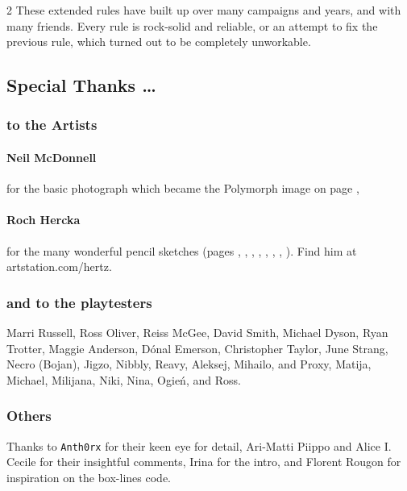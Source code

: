 \begin{multicols}{2}
These extended rules have built up over many \glspl{campaign} and years, and with many friends.
Every rule is rock-solid and reliable, or an attempt to fix the previous rule, which turned out to be completely unworkable.

\subsection*{Special Thanks \ldots}

\subsubsection*{to the Artists}

\paragraph{Neil McDonnell} for the basic photograph which became the Polymorph image on page \pageref{Roch_Hercka/polymorph},

\paragraph{Roch Hercka} for the many wonderful pencil sketches (pages 
\pageref{Roch_Hercka/cave_fight}, 
\pageref{Roch_Hercka/dwarf_encumbrance}, 
\pageref{Roch_Hercka/vitals_shot}, 
\pageref{Roch_Hercka/stances}, 
\pageref{Roch_Hercka/conjuration_right}, 
\pageref{Roch_Hercka/dwarvish_runes}, 
\pageref{Roch_Hercka/polymorph}, 
\pageref{Roch_Hercka/flashing_light}).
Find him at artstation.com/hertz.

\subsubsection*{and to the playtesters} Marri Russell, Ross Oliver, Reiss McGee, David Smith, Michael Dyson, Ryan Trotter, Maggie Anderson, 
D\'{o}nal Emerson, Christopher Taylor, June Strang, 
Necro (Bojan), Jigzo, Nibbly, Reavy, 
Aleksej, Mihailo, and Proxy,
Matija, Michael, Milijana, Niki, Nina, Ogie\'n,
and Ross.

\subsubsection*{Others}
Thanks to
\texttt{Anth0rx} for their keen eye for detail,
Ari-Matti Piippo and Alice I. Cecile for their insightful comments,
Irina for the intro,
and Florent Rougon for inspiration on the box-lines code.


\end{multicols}
